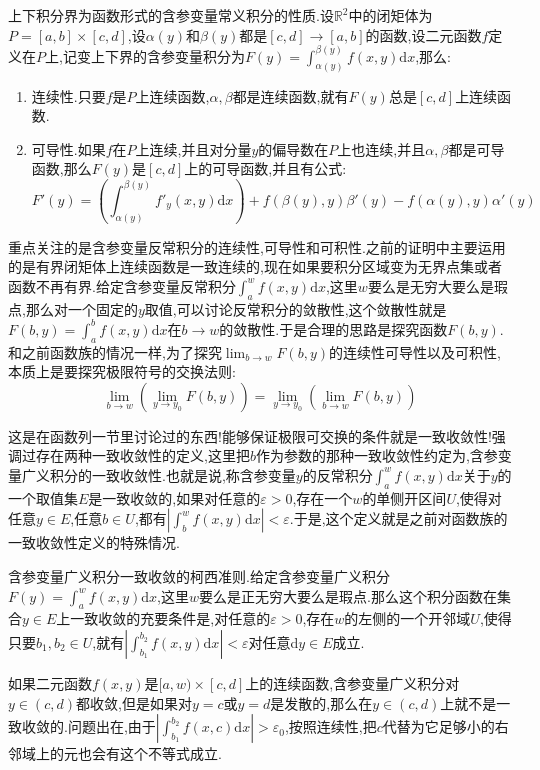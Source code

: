 上下积分界为函数形式的含参变量常义积分的性质.设$\mathbb{R}^2$中的闭矩体为$P=[a,b]\times[c,d]$,设$\alpha(y)$和$\beta(y)$都是$[c,d]\to[a,b]$的函数,设二元函数$f$定义在$P$上,记变上下界的含参变量积分为$F(y)=\int_{\alpha(y)}^{\beta(y)}f(x,y)\mathrm{d}x$,那么:
\begin{enumerate}
	\item 连续性.只要$f$是$P$上连续函数,$\alpha,\beta$都是连续函数,就有$F(y)$总是$[c,d]$上连续函数.
	\item 可导性.如果$f$在$P$上连续,并且对分量$y$的偏导数在$P$上也连续,并且$\alpha,\beta$都是可导函数,那么$F(y)$是$[c,d]$上的可导函数,并且有公式:
	$$F'(y)=\left(\int_{\alpha(y)}^{\beta(y)}f'_y(x,y)\mathrm{d}x\right)+f(\beta(y),y)\beta'(y)-f(\alpha(y),y)\alpha'(y)$$
\end{enumerate}

重点关注的是含参变量反常积分的连续性,可导性和可积性.之前的证明中主要运用的是有界闭矩体上连续函数是一致连续的,现在如果要积分区域变为无界点集或者函数不再有界.给定含参变量反常积分$\int_a^wf(x,y)\mathrm{d}x$,这里$w$要么是无穷大要么是瑕点,那么对一个固定的$y$取值,可以讨论反常积分的敛散性,这个敛散性就是$F(b,y)=\int_a^bf(x,y)\mathrm{d}x$在$b\to w$的敛散性.于是合理的思路是探究函数$F(b,y)$.和之前函数族的情况一样,为了探究$\lim_{b\to w}F(b,y)$的连续性可导性以及可积性,本质上是要探究极限符号的交换法则:
$$\lim_{b\to w}\left(\lim_{y\to y_0}F(b,y)\right)=\lim_{y\to y_0}\left(\lim_{b\to w}F(b,y)\right)$$

这是在函数列一节里讨论过的东西!能够保证极限可交换的条件就是一致收敛性!强调过存在两种一致收敛性的定义,这里把$b$作为参数的那种一致收敛性约定为,含参变量广义积分的一致收敛性.也就是说,称含参变量$y$的反常积分$\int_a^wf(x,y)\mathrm{d}x$关于$y$的一个取值集$E$是一致收敛的,如果对任意的$\varepsilon>0$,存在一个$w$的单侧开区间$U$,使得对任意$y\in E$,任意$b\in U$,都有$\left|\int_b^wf(x,y)\mathrm{d}x\right|<\varepsilon$.于是,这个定义就是之前对函数族的一致收敛性定义的特殊情况.

含参变量广义积分一致收敛的柯西准则.给定含参变量广义积分$F(y)=\int_a^wf(x,y)\mathrm{d}x$,这里$w$要么是正无穷大要么是瑕点.那么这个积分函数在集合$y\in E$上一致收敛的充要条件是,对任意的$\varepsilon>0$,存在$w$的左侧的一个开邻域$U$,使得只要$b_1,b_2\in U$,就有$\left|\int_{b_1}^{b_2}f(x,y)\mathrm{d}x\right|<\varepsilon$对任意d$y\in E$成立.

如果二元函数$f(x,y)$是$[a,w)\times[c,d]$上的连续函数,含参变量广义积分对$y\in(c,d)$都收敛,但是如果对$y=c$或$y=d$是发散的,那么在$y\in(c,d)$上就不是一致收敛的.问题出在,由于$\left|\int_{b_1}^{b_2}f(x,c)\mathrm{d}x\right|>\varepsilon_0$,按照连续性,把$c$代替为它足够小的右邻域上的元也会有这个不等式成立.


